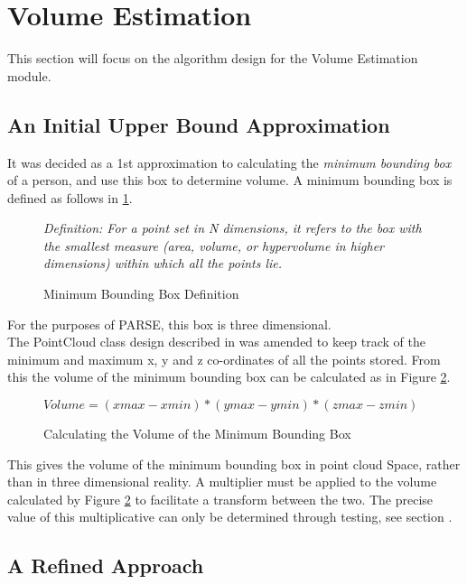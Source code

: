 \section{Volume Estimation}
\label{volume estimation}
This section will focus on the algorithm design for the Volume Estimation module.

\subsection{An Initial Upper Bound Approximation}
\label{an initial upper bound approximation}
It was decided as a 1st approximation to calculating the \textit{minimum bounding box} of a person, and use this box to determine volume. A minimum bounding box is defined as follows in \ref{fig:bounding_box_definition}.\\

\begin{figure}[h]
\textit{Definition: For a point set in N dimensions, it refers to the box with the smallest measure (area, volume, or hypervolume in higher dimensions) within which all the points lie.}
\caption {Minimum Bounding Box Definition \cite{Barequet2001}}
\label{fig:bounding_box_definition}
\end{figure}

For the purposes of PARSE, this box is three dimensional.\\

The PointCloud class design described in  was amended to keep track of the minimum and maximum x, y and z co-ordinates of all the points stored. From this the volume of the minimum bounding box can be calculated as in Figure  \ref{fig:calculating_the_volume_of_the_minimum_bounding_box}.\\

\begin{figure}[h]
\begin{center}
$Volume = (xmax -xmin) * (ymax - ymin) * (zmax - zmin)$
\end{center}
\caption{Calculating the Volume of the Minimum Bounding Box}
\label{fig:calculating_the_volume_of_the_minimum_bounding_box}
\end{figure}

This gives the volume of the minimum bounding box in point cloud Space, rather than in three dimensional reality. A multiplier must be applied to the volume calculated by Figure \ref{fig:calculating_the_volume_of_the_minimum_bounding_box} to facilitate a transform between the two. The precise value of this multiplicative can only be determined through testing, see section .

\subsection{A Refined Approach}
